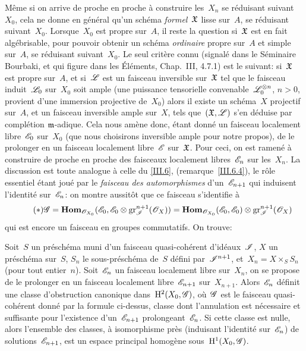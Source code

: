 M\^eme si on arrive de proche en proche \`a construire les~$X_n$
se r\'eduisant suivant~$X_0$, cela ne donne en g\'en\'eral qu'un
sch\'ema \emph{formel}~$\mathfrak{X}$ lisse sur~$A$, se r\'eduisant
suivant~$X_0$. Lorsque~$X_0$ est propre sur~$A$, il reste la question
si~$\mathfrak{X}$ est en fait alg\'ebrisable, pour pouvoir obtenir un
sch\'ema \emph{ordinaire} propre sur~$A$ et simple sur~$A$, se
r\'eduisant suivant~$X_0$. Le seul crit\`ere connu (signal\'e
dans le S\'eminaire Bourbaki, et qui figure dans les \'El\'ements,
Chap.\, III, 4.7.1) est le suivant: si~$\mathfrak{X}$ est propre sur~$A$, et
si~$\cal{L}$ est un faisceau inversible sur~$\mathfrak{X}$ tel que le
faisceau induit~$\cal{L}_0$ sur~$X_0$ soit ample (\ie une puissance
tensorielle convenable~$\cal{L}_0^{\otimes n}$, $n>0$, provient d'une
immersion projective de~$X_0$) alors il existe un sch\'ema~$X$
projectif sur~$A$, et un faisceau inversible ample sur~$X$, tels
que~$(\goth{X},\cal{L})$ s'en d\'eduise par compl\'etion
$\mathfrak{m}$-adique. Cela nous am\`ene donc, \'etant donn\'e un
faisceau localement libre~$\cal{E}_0$ sur~$X_0$ (que nous choisirons
inversible ample pour notre propos), de le prolonger en un faisceau
localement libre~$\cal{E}$ sur~$\mathfrak{X}$. Pour ceci, on est
ramen\'e \`a construire de proche en proche des faisceaux
localement libres~$\cal{E}_n$ sur les~$X_n$. La discussion est toute
analogue \`a celle du \No \ref{III.6}, (\cf remarque~\ref{III.6.4}), le r\^ole
essentiel \'etant jou\'e par le \emph{faisceau des automorphismes}
d'un~$\cal{E}_{n+1}$ qui induisent l'identit\'e sur~$\cal{E}_n$: on
montre aussit\^ot que ce faisceau s'identifie \`a
\begin{equation*}
\label{eq:III.7.*}\tag{$*$}{}
\cal{G}= \SheafHom_{\cal{O}_{X_0}}(\cal{E}_0,
\cal{E}_0\otimes\gr_{\cal{I}}^{n+1}(\cal{O}_X))=
\SheafHom_{\cal{O}_{X_0}}(\cal{E}_0,
\cal{E}_0)\otimes\gr_{\cal{I}}^{n+1}(\cal{O}_X)
\end{equation*}
qui est encore un faisceau en groupes commutatifs. On trouve:

\begin{proposition}\label{III.7.1}
Soit~$S$ un pr\'esch\'ema muni d'un faisceau quasi-coh\'erent
d'id\'eaux~$\cal{I}$, $X$ un pr\'esch\'ema sur~$S$, $S_n$ le
sous-pr\'esch\'ema de~$S$ d\'efini par~$\cal{I}^{n+1}$,
et~$X_n=X\times_SS_n$ (pour tout entier~$n$). Soit~$\cal{E}_n$ un
faisceau localement libre
sur~$X_n$, on se propose de le prolonger en un faisceau localement
libre~$\cal{E}_{n+1}$ sur~$X_{n+1}$. Alors~$\cal{E}_n$ d\'efinit une
classe d'obstruction canonique dans~$\H^2(X_0,\cal{G})$,
o\`u~$\cal{G}$ est le faisceau quasi-coh\'erent donn\'e par la
formule ci-dessus, classe dont l'annulation est n\'ecessaire et
suffisante pour l'existence d'un~$\cal{E}_{n+1}$
prolongeant~$\cal{E}_n$. Si cette classe est nulle, alors l'ensemble
des classes, \`a isomorphisme pr\`es (induisant l'identit\'e
sur~$\cal{E}_n$) de solutions~$\cal{E}_{n+1}$, est un espace principal
homog\`ene sous~$\H^1(X_0,\cal{G})$.
\end{proposition}

